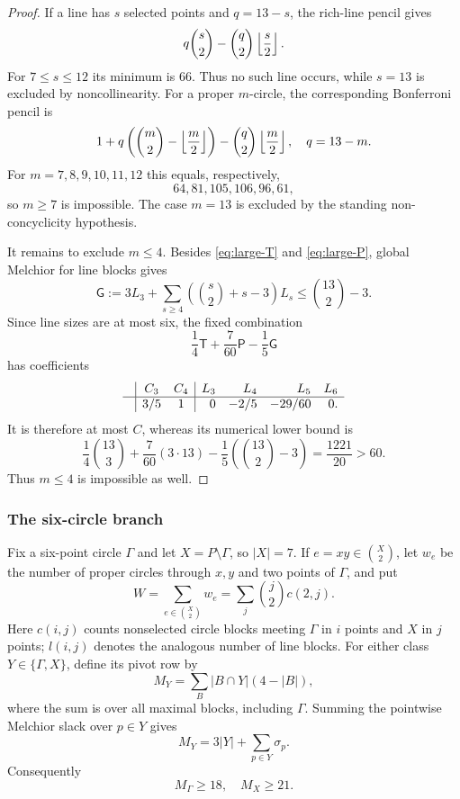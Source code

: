 \begin{proof}
If a line has $s$ selected points and $q=13-s$, the rich-line pencil gives
\begin{equation}
 q\binom{s}{2}-\binom q2\left\lfloor \frac s2\right\rfloor.           \label{eq:n13-line-pencil}
\end{equation}
For $7\leq s\leq12$ its minimum is $66$.  Thus no such line occurs, while
$s=13$ is excluded by noncollinearity.
For a proper $m$-circle, the corresponding Bonferroni pencil is
\begin{equation}
 1+q\left(\binom m2-\left\lfloor \frac m2\right\rfloor\right)
   -\binom q2\left\lfloor \frac m2\right\rfloor,\quad q=13-m.          \label{eq:n13-circle-pencil}
\end{equation}
For $m=7,8,9,10,11,12$ this equals, respectively,
\[
 64,81,105,106,96,61,
\]
so $m\geq7$ is impossible.  The case $m=13$ is excluded by the standing
non-concyclicity hypothesis.

It remains to exclude $m\leq4$.  Besides \eqref{eq:large-T} and
\eqref{eq:large-P}, global Melchior for line blocks gives
\[
 \mathsf G:=3L_3+\sum_{s\geq4}
 \left(\binom s2+s-3\right)L_s\leq\binom{13}{2}-3.
\]
Since line sizes are at most six, the fixed combination
\[
 \frac14\mathsf T+\frac7{60}\mathsf P-\frac15\mathsf G
\]
has coefficients
\[
\begin{array}{c|cc|rrrr}
 &C_3&C_4&L_3&L_4&L_5&L_6\\ \hline
 &3/5&1&0&-2/5&-29/60&0.
\end{array}
\]
It is therefore at most $C$, whereas its numerical lower bound is
\[
 \frac14\binom{13}{3}+\frac7{60}(3\cdot13)
 -\frac15\left(\binom{13}{2}-3\right)
 =\frac{1221}{20}>60.
\]
Thus $m\leq4$ is impossible as well.
\end{proof}

\subsubsection{The six-circle branch}

Fix a six-point circle $\Gamma$ and let $X=P\setminus\Gamma$, so
$|X|=7$.  If $e=xy\in\binom X2$, let $w_e$ be the number of proper
circles through $x,y$ and two points of $\Gamma$, and put
\begin{equation}
 W=\sum_{e\in\binom X2}w_e
   =\sum_j\binom j2c(2,j).                          \label{eq:n13-W}
\end{equation}
Here $c(i,j)$ counts nonselected circle blocks meeting $\Gamma$ in $i$
points and $X$ in $j$ points; $l(i,j)$ denotes the analogous number of
line blocks.
For either class $Y\in\{\Gamma,X\}$, define its pivot row by
\begin{equation}
 M_Y=\sum_B |B\cap Y|(4-|B|),                       \label{eq:n13-class-pivot}
\end{equation}
where the sum is over all maximal blocks, including $\Gamma$.
Summing the pointwise Melchior slack over $p\in Y$ gives
\[
 M_Y=3|Y|+\sum_{p\in Y}\sigma_p.
\]
Consequently
\begin{equation}
 M_\Gamma\geq18,\quad M_X\geq21.                    \label{eq:n13-class-pivot-bounds}
\end{equation}

